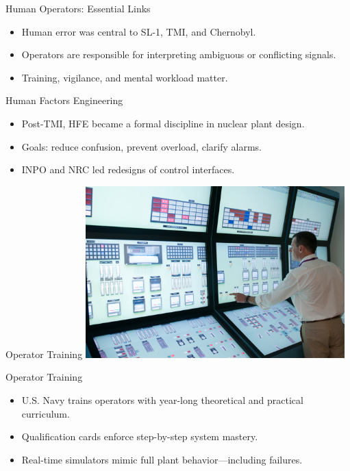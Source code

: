 \documentclass{beamer}
\begin{document}
\begin{frame}{Human Operators: Essential Links}
  \begin{itemize}
    \item Human error was central to SL-1, TMI, and Chernobyl.
    \item Operators are responsible for interpreting ambiguous or conflicting signals.
    \item Training, vigilance, and mental workload matter.
  \end{itemize}
\end{frame}


\begin{frame}{Human Factors Engineering}
  \begin{itemize}
    \item Post-TMI, HFE became a formal discipline in nuclear plant design.
    \item Goals: reduce confusion, prevent overload, clarify alarms.
    \item INPO and NRC led redesigns of control interfaces.
  \end{itemize}
\end{frame}

\begin{frame}{Operator Training}
  \centering
  \includegraphics[width=0.75\textwidth]{simulators.jpg}
\end{frame}

\begin{frame}{Operator Training}
  \begin{itemize}
    \item U.S. Navy trains operators with year-long theoretical and practical curriculum.
    \item Qualification cards enforce step-by-step system mastery.
    \item Real-time simulators mimic full plant behavior—including failures.
  \end{itemize}
\end{frame}
\end{document}
